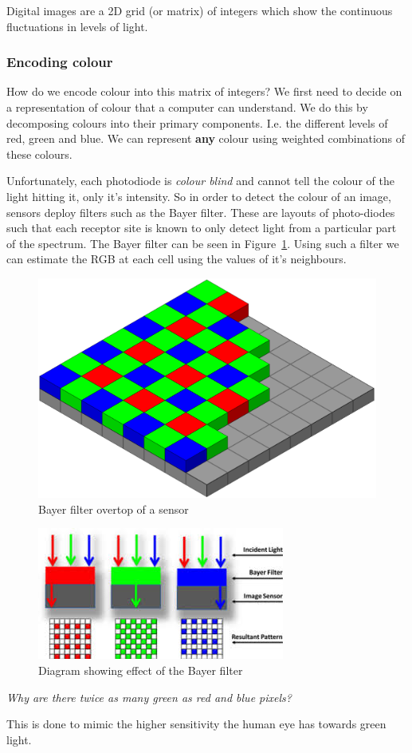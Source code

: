\documentclass{article}
\begin{document}
Digital images are a 2D grid (or matrix) of integers which show the continuous fluctuations in levels of light.

\subsubsection{Encoding colour}

How do we encode colour into this matrix of integers? We first need to decide on a representation of colour that a computer can understand. We do this by decomposing colours into their primary components. I.e. the different levels of red, green and blue. We can represent \textbf{any} colour using weighted combinations of these colours.

Unfortunately, each photodiode is \textit{colour blind} and cannot tell the colour of the light hitting it, only it's intensity. So in order to detect the colour of an image, sensors deploy filters such as the Bayer filter. These are layouts of photo-diodes such that each receptor site is known to only detect light from a particular part of the spectrum. The Bayer filter can be seen in Figure~\ref{fig:bayer1}. Using such a filter we can estimate the RGB at each cell using the values of it's neighbours.

\begin{figure}[ht]
  \centering
  \includegraphics[scale=0.1]{figures/bayer1.png}
  \caption{\label{fig:bayer1} Bayer filter overtop of a sensor}
\end{figure}

\begin{figure}[ht]
  \centering
  \includegraphics[scale=0.5]{figures/bayer2.jpeg}
  \caption{\label{fig:bayer2} Diagram showing effect of the Bayer filter}
\end{figure}

\textit{Why are there twice as many green as red and blue pixels?}

This is done to mimic the higher sensitivity the human eye has towards green light.
\end{document}
